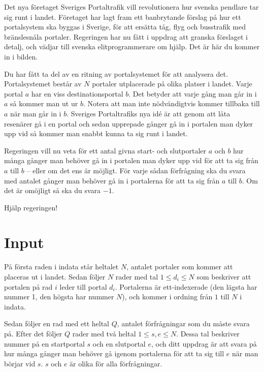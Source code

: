 
Det nya företaget Sveriges Portaltrafik vill revolutionera hur svenska
pendlare tar sig runt i landet. Företaget har lagt fram
ett banbrytande förslag på hur ett portalsystem ska byggas i Sverige, för
att ersätta tåg, flyg och busstrafik med bränslesnåla portaler. Regeringen
har nu fått i uppdrag att granska förslaget i detalj, och vädjar till
svenska elitprogrammerare om hjälp. Det är här du kommer in i bilden.

Du har fått ta del av en ritning av portalsystemet för att analysera det.
Portalsystemet består av $N$ portaler utplacerade på olika platser i landet. Varje portal $a$
har en viss destinationsportal $b$. Det betyder att varje gång man går in i $a$ så kommer man
ut ur $b$. Notera att man inte nödvändigtvis kommer tillbaka till $a$ när man går in i $b$.
Sveriges Portaltrafiks nya idé är att genom att låta resenärer gå
i en portal och sedan upprepade gånger gå in i portalen man dyker upp vid så kommer man snabbt
kunna ta sig runt i landet.

Regeringen vill nu veta för ett antal givna start- och slutportaler $a$ och $b$
hur många gånger man behöver gå in i portalen man dyker upp vid för att ta sig från $a$ till
$b$ -- eller om det ens är möjligt. För varje sådan förfrågning ska du svara med antalet
gånger man behöver gå in i portalerna för att ta sig från $a$ till $b$. Om det är omöjligt
så ska du svara $-1$.

Hjälp regeringen!

\section*{Input}

På första raden i indata står heltalet $N$, antalet portaler som kommer att placeras ut i landet.
Sedan följer $N$ rader med tal $1 \le d_i \le N$ som beskriver att portalen på rad $i$ leder till portal $d_i$.
Portalerna är ett-indexerade (den lägsta har nummer 1, den högsta har nummer $N$), och kommer i ordning från $1$ till $N$ i indata.

Sedan följer en rad med ett heltal $Q$, antalet förfrågningar som du måste svara på. Efter det
följer $Q$ rader med två heltal $1 \le s, e \le N$. Dessa tal beskriver nummer på en startportal $s$ och en
slutportal $e$, och ditt uppdrag är att svara på hur många gånger man behöver gå igenom portalerna
för att ta sig till $e$ när man börjar vid $s$. $s$ och $e$ är olika för alla förfrågningar.

